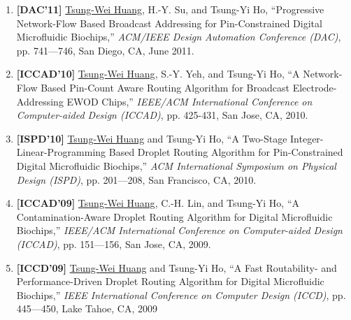 \documentclass[A4,11pt]{article}
\begin{document}
\begin{enumerate}
    \item \textbf{[DAC'11]} \underline{Tsung-Wei Huang}, H.-Y. Su, and Tsung-Yi Ho, ``Progressive Network-Flow Based Broadcast Addressing for Pin-Constrained Digital Microfluidic Biochips,'' \textit{ACM/IEEE Design Automation Conference (DAC)}, pp. 741—746, San Diego, CA, June 2011. 

    \item \textbf{[ICCAD'10]} \underline{Tsung-Wei Huang}, S.-Y. Yeh, and Tsung-Yi Ho, ``A Network-Flow Based Pin-Count Aware Routing Algorithm for Broadcast Electrode-Addressing EWOD Chips,'' \textit{IEEE/ACM International Conference on Computer-aided Design (ICCAD)}, pp. 425-431, San Jose, CA, 2010. 

    \item \textbf{[ISPD'10]} \underline{Tsung-Wei Huang} and Tsung-Yi Ho, ``A Two-Stage Integer-Linear-Programming Based Droplet Routing Algorithm for Pin-Constrained Digital Microfluidic Biochips,'' \textit{ACM International Symposium on Physical Design (ISPD)}, pp. 201—208, San Francisco, CA, 2010. 

    \item \textbf{[ICCAD'09]} \underline{Tsung-Wei Huang}, C.-H. Lin, and Tsung-Yi Ho, ``A Contamination-Aware Droplet Routing Algorithm for Digital Microfluidic Biochips,'' \textit{IEEE/ACM International Conference on Computer-aided Design (ICCAD)}, pp. 151—156, San Jose, CA, 2009. 

    \item \textbf{[ICCD'09]} \underline{Tsung-Wei Huang} and Tsung-Yi Ho, ``A Fast Routability- and Performance-Driven Droplet Routing Algorithm for Digital Microfluidic Biochips,'' \textit{IEEE International Conference on Computer Design (ICCD)}, pp. 445—450, Lake Tahoe, CA, 2009

 \end{enumerate}
\end{document}
